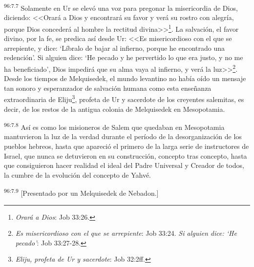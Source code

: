 \par
\textsuperscript{96:7.7} Solamente en Ur se elevó una voz para pregonar la misericordia de Dios, diciendo: <<Orará a Dios y encontrará su favor y verá su rostro con alegría, porque Dios concederá al hombre la rectitud divina>>\footnote{\textit{Orará a Dios}: Job 33:26.}. La salvación, el favor divino, por la fe, se predica así desde Ur: <<Es misericordioso con el que se arrepiente, y dice: `Líbralo de bajar al infierno, porque he encontrado una redención'. Si alguien dice: `He pecado y he pervertido lo que era justo, y no me ha beneficiado', Dios impedirá que su alma vaya al infierno, y verá la luz>>\footnote{\textit{Es misericordioso con el que se arrepiente}: Job 33:24. \textit{Si alguien dice: `He pecado'}: Job 33:27-28.}. Desde los tiempos de Melquisedek, el mundo levantino no había oído un mensaje tan sonoro y esperanzador de salvación humana como esta enseñanza extraordinaria de Eliju\footnote{\textit{Eliju, profeta de Ur y sacerdote}: Job 32:2ff.}, profeta de Ur y sacerdote de los creyentes salemitas, es decir, de los restos de la antigua colonia de Melquisedek en Mesopotamia.

\par
\textsuperscript{96:7.8} Así es como los misioneros de Salem que quedaban en Mesopotamia mantuvieron la luz de la verdad durante el período de la desorganización de los pueblos hebreos, hasta que apareció el primero de la larga serie de instructores de Israel, que nunca se detuvieron en su construcción, concepto tras concepto, hasta que consiguieron hacer realidad el ideal del Padre Universal y Creador de todos, la cumbre de la evolución del concepto de Yahvé.

\par
\textsuperscript{96:7.9} [Presentado por un Melquisedek de Nebadon.]